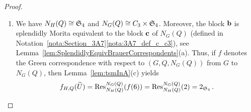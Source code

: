 \begin{proof}
\begin{enumerate}[label={\rm(\alph*)}]
    
    \item We have $N_H(Q)\cong {\mathfrak{S}}_4$ and $N_G(Q)\cong C_3\times {\mathfrak{S}}_4$. Moreover, the block ${\mathbf{b}}$ is splendidly Morita equivalent to the block ${\mathbf{c}}$ of $N_G(Q)$ (defined in Notation~\ref{nota:Section_3A7}\ref{nota:3A7_def_c_c3}), see Lemma~\ref{lem:SplendidlyEquivBrauerCorrespondents}(a).
    Thus, if $f$ denotes the Green correspondence with respect to $(G,Q,N_G(Q))$ from $G$ to $N_G(Q)$, then Lemma~\ref{lem:tsmInA}(c) yields 
    \[
        f_{H,Q}(\widetilde{U})=\operatorname{Res}^{N_G(Q)}_{N_H(Q)}(f(6))=\operatorname{Res}^{N_G(Q)}_{N_H(Q)}(2)= 2_{{\mathfrak{S}}_4}\,.
    \]
\end{enumerate} 
\end{proof}



